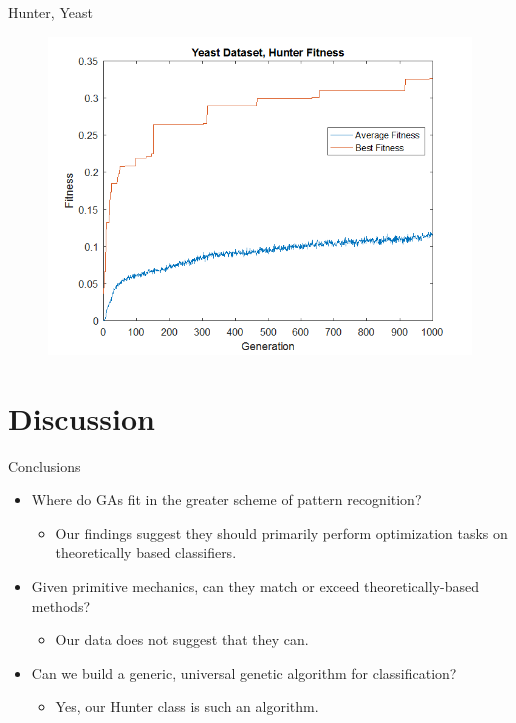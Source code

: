\documentclass{beamer}
\begin{document}
\begin{frame} {Hunter, Yeast}
	\begin{figure}
		\centering
		\includegraphics[width=.95\linewidth]{figures/png/yeastHunter}
		\label{fig:fitnessYeastHunter}
	\end{figure}
	
\end{frame}


\section{Discussion}
\begin{frame}{Conclusions}
	\begin{itemize}
		\item Where do GAs fit in the greater scheme of pattern recognition?
		\begin{itemize}
			\item Our findings suggest they should primarily perform optimization tasks on theoretically based classifiers.
		\end{itemize}
		\item Given primitive mechanics, can they match or exceed theoretically-based methods?
		\begin{itemize}
			\item Our data does not suggest that they can.
		\end{itemize}
	\item Can we build a generic, universal genetic algorithm for classification?
		\begin{itemize}
			\item Yes, our Hunter class is such an algorithm.
	\end{itemize}
\end{itemize}	
\end{frame}
\end{document}
